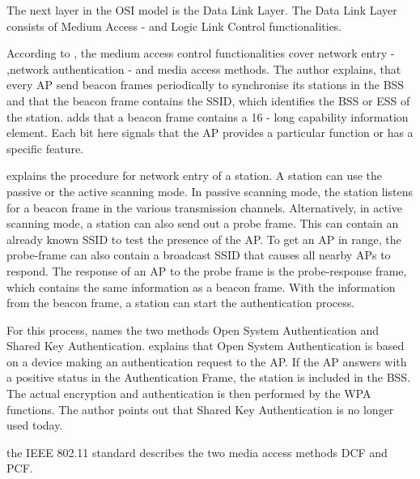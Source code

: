 \documentclass[]{nsm-thesis}
\begin{document}
The next layer in the OSI model is the Data Link Layer.
The Data Link Layer consists of Medium Access - and Logic Link Control functionalities.


According to \textcite{kauffels_wireless_2002}, the medium access control functionalities cover network entry - ,network authentication - and media access methods.
The author explains, that every \ac{AP} send beacon frames periodically to synchronise its stations in the \ac{BSS} and that the beacon frame contains the \ac{SSID}, which identifies the \ac{BSS} or \ac{ESS} of the station. \textcite{sauter_wireless_2022} adds that a beacon frame contains a \SI{16}{\bit} - long capability information element. Each bit here signals that the \ac{AP} provides a particular function or has a specific feature. 

\textcite{kauffels_wireless_2002} explains the procedure for network entry of a station. A station can use the passive or the active scanning mode. In passive scanning mode, the station listens for a beacon frame in the various transmission channels. Alternatively, in active scanning mode, a station can also send out a probe frame. This can contain an already known \ac{SSID} to test the presence of the \ac{AP}. To get an \ac{AP} in range, the probe-frame can also contain a broadcast SSID that causes all nearby \ac{AP}s to respond. The response of an \ac{AP} to the probe frame is the probe-response frame, which contains the same information as a beacon frame. With the information from the beacon frame, a station can start the authentication process.
 
For this process, \textcite{kauffels_wireless_2002} names the two methods Open System Authentication and Shared Key Authentication. \textcite{sauter_wireless_2022} explains that Open System Authentication is based on a device making an authentication request to the \ac{AP}. If the \ac{AP} answers with a positive status in the Authentication Frame, the station is included in the \ac{BSS}. The actual encryption and authentication is then performed by the \ac{WPA} functions. The author points out that Shared Key Authentication is no longer used today. 

 the IEEE 802.11 standard describes the two media access methods \ac{DCF} and \ac{PCF}.
\end{document}

